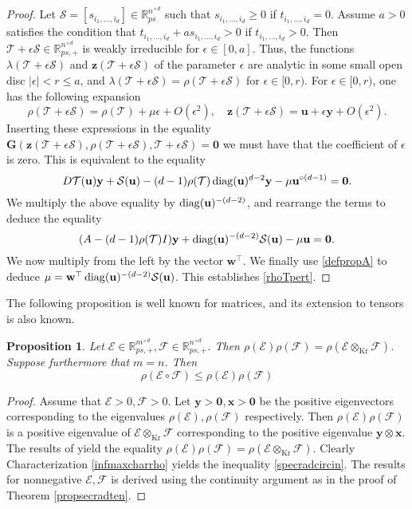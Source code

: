 \documentclass{amsart}
\newcommand{\differential}{D}
\newcommand{\diag}{\operatorname{diag}}
\newcommand{\R}{\mathbb{R}}
\newcommand{\bG}{\mathbf{G}}
\newcommand{\uu}{\mathbf{u}}
\newcommand{\w}{\mathbf{w}}
\newcommand{\x}{\mathbf{x}}
\newcommand{\y}{\mathbf{y}}
\newcommand{\z}{\mathbf{z}}
\newcommand{\0}{\mathbf{0}}
\newcommand{\1}{\mathbf{1}}
\newcommand{\cE}{\mathcal{E}}
\newcommand{\cF}{\mathcal{F}}
\newcommand{\cS}{\mathcal{S}}
\newcommand{\cT}{\mathcal{T}}
\def\diag{\mathop{{\rm diag}}\nolimits}
\newcommand{\Kron}{\mathop{\mathrm{Kr}}\nolimits}
\newcommand{\trans}{^\top}
\newtheorem{proposition}[theo]{Proposition}
\theoremstyle{remark}
\numberwithin{equation}{section} %
\renewcommand{\ge}{\geqslant}
\renewcommand{\le}{\leqslant}
\begin{document}
\begin{proof}
 Let $\cS=[s_{i_1,\ldots,i_d}]\in \R^{n^{\times d}}_{ps}$ such that $s_{i_1,\ldots,i_d}\ge 0$ if $t_{i_1,\ldots,i_d}=0$.
 Assume $a>0$ satisfies the condition that $t_{i_1,\ldots,i_d}+as_{i_1,\ldots,i_d}>0$ if $t_{i_1,\ldots,i_d}>0$.  Then $\cT+\epsilon\cS\in\R_{ps,+}^{n^{\times d}}$
 is weakly irreducible for $\epsilon\in[0,a]$.  Thus, the functions
$\lambda(\cT+\epsilon \cS)$ and $\z(\cT+\epsilon\cS)$ of the parameter
$\epsilon$ are analytic in some small open disc $|\epsilon|<r\le a$,
 and $\lambda(\cT+\epsilon \cS)=\rho(\cT+\epsilon\cS)$ for $\epsilon \in [0,r)$.
For $\epsilon\in [0,r)$,
one has the following expansion
 \[\rho(\cT+\epsilon\cS)=\rho(\cT)+\mu\epsilon +O(\epsilon^2), \quad \z(\cT+\epsilon\cS)=\uu+\epsilon\y+O(\epsilon^2).\]
 Inserting these expressions in the equality $\bG(\z(\cT+\epsilon\cS),\rho(\cT+\epsilon\cS), \cT+\epsilon\cS)=\0$ we 
must have that the coefficient of $\epsilon$
 is zero.  This is equivalent to the equality
 \[\differential\cT(\uu)\y+\cS(\uu)-(d-1)\rho(\cT)\diag(\uu)^{d-2}\y-\mu\uu^{\circ(d-1)}=\0.\]
We multiply the above equality by $\diag(\uu)^{-(d-2)}$, and rearrange the terms to deduce the equality
 \[(A-(d-1)\rho(\cT)I)\y+\diag(\uu)^{-(d-2)}\cS(\uu)-\mu\uu=\0.\]
We now multiply from the left by the vector $\w\trans$.  We finally use \eqref{defpropA} to deduce $\mu=\w\trans \diag(\uu)^{-(d-2)}\cS(\uu)$.
 This establishes \eqref{rhoTpert}.  \end{proof}


The following proposition is well known for matrices, and its extension to tensors is also known. 
%
 \begin{proposition}\label{specradprodeq}  Let $\cE\in\R_{ps,+}^{m^{\times d}},\cF\in\R_{ps,+}^{n^{\times d}}$.  Then $\rho(\cE)\rho(\cF)=\rho(\cE\otimes_{\Kron}\cF)$.
 Suppose furthermore that $m=n$. Then
 \begin{equation}\label{specradcircin}
 \rho(\cE\circ\cF)\le \rho(\cE)\rho(\cF)
 \end{equation}
 \end{proposition}
 \begin{proof} Assume that $\cE>0,\cF>0$.  Let $\y>\0,\x>\0$ be the positive eigenvectors corresponding to the eigenvalues $\rho(\cE),\rho(\cF)$ respectively.
 Then $\rho(\cE)\rho(\cF)$ is a positive eigenvalue of $\cE\otimes_{\Kron}\cF$ corresponding to the positive eigenvalue $\y\otimes\x$.  The results of \cite{CPZ08}
 yield the equality $\rho(\cE)\rho(\cF)=\rho(\cE\otimes_{\Kron}\cF)$.  Clearly
 Characterization \eqref{infmaxcharrho} yields the inequality \eqref{specradcircin}.  The results for nonnegative $\cE,\cF$ is derived using the continuity
 argument as in the proof of Theorem \ref{propsecradten}.  \end{proof}
\end{document}
